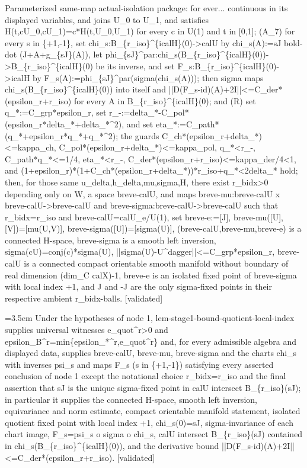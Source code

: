 \documentclass{article}
\newcommand{\step}[1]{\par\noindent\hangindent=3.5em\hangafter=1%
  \makebox[3.5em][l]{\textbf{#1.}}}
\newcommand{\steptag}[1]{\hfill{\small\textsf{[#1]}}}
\begin{document}
\begin{proofbox}{Parameterized same-map actual-isolation package: for ever...}
continuous in its displayed variables, and joins U\_0 to U\_1, and satisfies H(t,cU\_0,cU\_1)=c*H(t,U\_0,U\_1) for every c in U(1) and t in [0,1]; (A\_7) for every s in \{+1,-1\}, set chi\_s:B\_\{r\_iso\}\textasciicircum{}\{icalH\}(0)->calU by chi\_s(A):=sJ bold-dot (J+A+g\_\{sJ\}(A)), let phi\_\{sJ\}\textasciicircum{}par:chi\_s(B\_\{r\_iso\}\textasciicircum{}\{icalH\}(0))->B\_\{r\_iso\}\textasciicircum{}\{icalH\}(0) be its inverse, and set F\_s:B\_\{r\_iso\}\textasciicircum{}\{icalH\}(0)->icalH by F\_s(A):=phi\_\{sJ\}\textasciicircum{}par(sigma(chi\_s(A))); then sigma maps chi\_s(B\_\{r\_iso\}\textasciicircum{}\{icalH\}(0)) into itself and ||D(F\_s-id)(A)+2I||<=C\_der*(epsilon\_r+r\_iso) for every A in B\_\{r\_iso\}\textasciicircum{}\{icalH\}(0); and (R) set q\_*:=C\_grp*epsilon\_r, set r\_-:=delta\_*-C\_pol*(epsilon\_r*delta\_*+delta\_*\textasciicircum{}2), and set eta\_*:=C\_path*(q\_*+epsilon\_r*q\_*+q\_*\textasciicircum{}2); the guards C\_ch*(epsilon\_r+delta\_*)<=kappa\_ch, C\_pol*(epsilon\_r+delta\_*)<=kappa\_pol, q\_*<r\_-, C\_path*q\_*<=1/4, eta\_*<r\_-, C\_der*(epsilon\_r+r\_iso)<=kappa\_der/4<1, and (1+epsilon\_r)*(1+C\_ch*(epsilon\_r+delta\_*))*r\_iso+q\_*<2delta\_* hold; then, for those same u\_delta,h\_delta,mu,sigma,H, there exist r\_bidx>0 depending only on W, a space breve-calU, and maps breve-mu:breve-calU x breve-calU->breve-calU and breve-sigma:breve-calU->breve-calU such that r\_bidx=r\_iso and breve-calU=calU\_e/U(1), set breve-e:=[J], breve-mu([U],[V])=[mu(U,V)], breve-sigma([U])=[sigma(U)], (breve-calU,breve-mu,breve-e) is a connected H-space, breve-sigma is a smooth left inversion, sigma(cU)=conj(c)*sigma(U), ||sigma(U)-U\textasciicircum{}dagger||<=C\_grp*epsilon\_r, breve-calU is a connected compact orientable smooth manifold without boundary of real dimension (dim\_C calX)-1, breve-e is an isolated fixed point of breve-sigma with local index +1, and J and -J are the only sigma-fixed points in their respective ambient r\_bidx-balls. \steptag{validated} \\[6pt]
\step{1.1} Under the hypotheses of node 1, lem-stage1-bound-quotient-local-index supplies universal witnesses e\_quot\textasciicircum{}r>0 and epsilon\_B\textasciicircum{}r=min\{epsilon\_*\textasciicircum{}r,e\_quot\textasciicircum{}r\} and, for every admissible algebra and displayed data, supplies breve-calU, breve-mu, breve-sigma and the charts chi\_s with inverses psi\_s and maps F\_s (s in \{+1,-1\}) satisfying every asserted conclusion of node 1 except the notational choice r\_bidx=r\_iso and the final assertion that sJ is the unique sigma-fixed point in calU intersect B\_\{r\_iso\}(sJ); in particular it supplies the connected H-space, smooth left inversion, equivariance and norm estimate, compact orientable manifold statement, isolated quotient fixed point with local index +1, chi\_s(0)=sJ, sigma-invariance of each chart image, F\_s=psi\_s o sigma o chi\_s, calU intersect B\_\{r\_iso\}(sJ) contained in chi\_s(B\_\{r\_iso\}\textasciicircum{}\{icalH\}(0)), and the derivative bound ||D(F\_s-id)(A)+2I||<=C\_der*(epsilon\_r+r\_iso). \steptag{validated} \\[4pt]

\end{proofbox}
\end{document}
